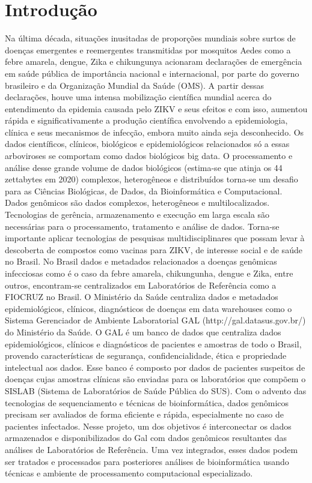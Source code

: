 \chapter{Introdução}

Na última década, situações inusitadas de proporções mundiais sobre surtos de doenças emergentes e reemergentes transmitidas por mosquitos Aedes como a febre amarela, dengue, Zika e chikungunya acionaram declarações de emergência em saúde pública de importância nacional e internacional, por parte do governo brasileiro e da Organização Mundial da Saúde (OMS). A partir dessas declarações, houve uma intensa mobilização científica mundial acerca do entendimento da epidemia causada pelo ZIKV e seus efeitos e com isso, aumentou rápida e significativamente a produção científica envolvendo a epidemiologia, clínica e seus mecanismos de infecção, embora muito ainda seja desconhecido. Os dados científicos, clínicos, biológicos e epidemiológicos relacionados só a essas arboviroses se comportam como dados biológicos big data. O processamento e análise desse grande volume de dados biológicos (estima-se que atinja os 44 zettabytes em 2020) complexos, heterogêneos e distribuídos torna-se um desafio para as Ciências Biológicas, de Dados, da Bioinformática e Computacional.
Dados genômicos são dados complexos, heterogêneos e multilocalizados. Tecnologias de gerência, armazenamento e execução em larga escala são necessárias para o processamento, tratamento e análise de dados. Torna-se importante aplicar tecnologias de pesquisas multidisciplinares que possam levar à descoberta de compostos como vacinas para ZIKV, de interesse social e de saúde no Brasil. 
No Brasil dados e metadados relacionados a doenças genômicas infecciosas como é o caso da febre amarela, chikungunha, dengue e Zika, entre outros, encontram-se centralizados em Laboratórios de Referência como a FIOCRUZ no Brasil. O Ministério da Saúde centraliza dados e metadados epidemiológicos, clínicos, diagnósticos de doenças em data warehouses como o Sistema Gerenciador de Ambiente Laboratorial GAL (http://gal.datasus.gov.br/) do Ministério da Saúde. O GAL é um banco de dados que centraliza dados epidemiológicos, clínicos e diagnósticos de pacientes e amostras de todo o Brasil, provendo características de segurança, confidencialidade, ética e propriedade intelectual aos dados. Esse banco é composto por dados de pacientes suspeitos de doenças cujas amostras clínicas são enviadas para os laboratórios que compõem o SISLAB (Sistema de Laboratórios de Saúde Pública do SUS). Com o advento das tecnologias de sequenciamento e técnicas de bioinformática, dados genômicos precisam ser avaliados de forma eficiente e rápida, especialmente no caso de pacientes infectados. Nesse projeto, um dos objetivos é interconectar os dados armazenados e disponibilizados do Gal com dados genômicos resultantes das análises de Laboratórios de Referência. Uma vez integrados, esses dados podem ser tratados e processados para posteriores análises de bioinformática usando técnicas e ambiente de processamento computacional especializado. 
